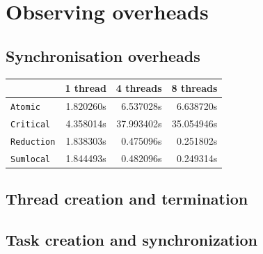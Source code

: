 \section{Observing overheads}
\label{sec:observing_overheads}

\subsection{Synchronisation overheads}

\begin{table}[H]
\centering
\begin{tabular}{lrrr}
\toprule
    & 1 thread & 4 threads & 8 threads \\
\midrule
    \texttt{Atomic}      & 1.820260s     & 6.537028s     & 6.638720s     \\
    \texttt{Critical}    & 4.358014s     & 37.993402s    & 35.054946s    \\
    \texttt{Reduction}   & 1.838303s     & 0.475096s     & 0.251802s     \\
    \texttt{Sumlocal}    & 1.844493s     & 0.482096s     & 0.249314s     \\
\bottomrule
\end{tabular}
\label{tab:}
\end{table}



\subsection{Thread creation and termination}

\subsection{Task creation and synchronization}


